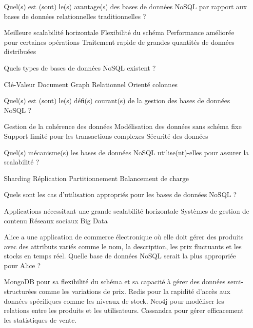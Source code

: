\documentclass[12pt,a4paper,addpoints,answers]{exam}
\begin{document}
\begin{questions}
		\question[1] Quel(s) est (sont) le(s) avantage(s) des bases de données NoSQL par rapport aux bases de données relationnelles traditionnelles ?
		\begin{checkboxes}
			\CorrectChoice Meilleure scalabilité horizontale
			\CorrectChoice Flexibilité du schéma
			\CorrectChoice Performance améliorée pour certaines opérations
			\CorrectChoice Traitement rapide de grandes quantités de données distribuées
		\end{checkboxes}
		
		\question[\half] Quels types de bases de données NoSQL existent ?
		\begin{checkboxes}
			\CorrectChoice Clé-Valeur
			\CorrectChoice Document
			\CorrectChoice Graph
			\choice Relationnel
			\CorrectChoice Orienté colonnes
		\end{checkboxes}
		
		\question[1] Quel(s) est (sont) le(s) défi(s) courant(s) de la gestion des bases de données NoSQL ?
		\begin{checkboxes}
			\CorrectChoice Gestion de la cohérence des données
			\CorrectChoice Modélisation des données sans schéma fixe
			\CorrectChoice Support limité pour les transactions complexes
			\CorrectChoice Sécurité des données
		\end{checkboxes}
		
		\question[1] Quel(s) mécanisme(s) les bases de données NoSQL utilise(nt)-elles pour assurer la scalabilité ?
		\begin{checkboxes}
			\CorrectChoice Sharding
			\CorrectChoice Réplication
			\CorrectChoice Partitionnement
			\CorrectChoice Balancement de charge
		\end{checkboxes}
		
		\question[1] Quels sont les cas d'utilisation appropriés pour les bases de données NoSQL ?
		\begin{checkboxes}
			\CorrectChoice Applications nécessitant une grande scalabilité horizontale
			\CorrectChoice Systèmes de gestion de contenu
			\CorrectChoice Réseaux sociaux
			\CorrectChoice Big Data
		\end{checkboxes}
		
		\question[1] Alice a une application de commerce électronique où elle doit gérer des produits avec des attributs variés comme le nom, la description, les prix fluctuants et les stocks en temps réel. Quelle base de données NoSQL serait la plus appropriée pour Alice ?
		\begin{checkboxes}
			\CorrectChoice MongoDB pour sa flexibilité du schéma et sa capacité à gérer des données semi-structurées comme les variations de prix.
			\choice Redis pour la rapidité d'accès aux données spécifiques comme les niveaux de stock.
			\choice Neo4j pour modéliser les relations entre les produits et les utilisateurs.
			\choice Cassandra pour gérer efficacement les statistiques de vente.
		\end{checkboxes}
		

\end{questions}
\end{document}
